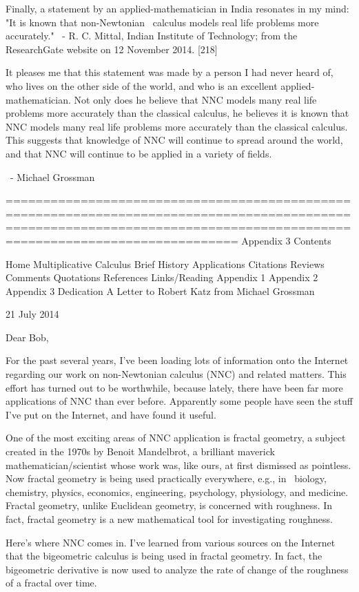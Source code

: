\documentclass[12pt]{article}
\begin{document}
Finally, a statement by an applied-mathematician in India resonates in my mind:
"It is known that non-Newtonian  calculus models real life problems more accurately."
 - R. C. Mittal, Indian Institute of Technology; from the ResearchGate website on 12 November 2014. [218]

It pleases me that this statement was made by a person I had never heard of, who lives on the other side of the world, and who is an excellent applied-mathematician. Not only does he believe that NNC models many real life problems more accurately than the classical calculus, he believes it is known that NNC models many real life problems more accurately than the classical calculus. This suggests that knowledge of NNC will continue to spread around the world, and that NNC will continue to be applied in a variety of fields.

 - Michael Grossman



=========================================================================================================================================================================
Appendix 3
Contents

Home
Multiplicative Calculus
Brief History
Applications
Citations
Reviews
Comments
Quotations
References
Links/Reading
Appendix 1
Appendix 2
Appendix 3
Dedication
A Letter to Robert Katz from Michael Grossman


21 July 2014

Dear Bob,

For the past several years, I've been loading lots of information onto the Internet regarding our work on non-Newtonian calculus (NNC) and related matters. This effort has turned out to be worthwhile, because lately, there have been far more applications of NNC than ever before. Apparently some people have seen the stuff I've put on the Internet, and have found it useful.

One of the most exciting areas of NNC application is fractal geometry, a subject created in the 1970s by Benoit Mandelbrot, a brilliant maverick mathematician/scientist whose work was, like ours, at first dismissed as pointless. Now fractal geometry is being used practically everywhere, e.g., in  biology, chemistry, physics, economics, engineering, psychology, physiology, and medicine. Fractal geometry, unlike Euclidean geometry, is concerned with roughness. In fact, fractal geometry is a new mathematical tool for investigating roughness. 

Here's where NNC comes in. I've learned from various sources on the Internet that the bigeometric calculus is being used in fractal geometry. In fact, the bigeometric derivative is now used to analyze the rate of change of the roughness of a fractal over time.
\end{document}
